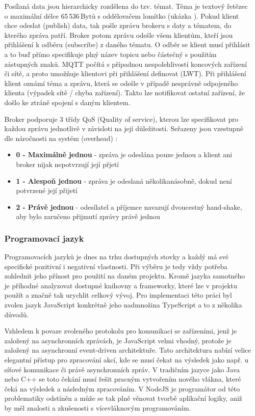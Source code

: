 Posílaná data jsou hierarchicky rozdělena do tzv. témat. Téma je textový řetězec o maximální délce 65\,536\,Bytů s oddělovačem lomítko (ukázka ). Pokud klient chce odeslat (publish) data, tak pošle zprávu brokeru s daty a tématem, do kterého zpráva patří. Broker potom zprávu odešle všem klientům, kteří jsou přihlášení k odběru (subscribe) z daného tématu. O odběr se klient musí přihlásit a to buď přímo specifikuje plný název topicu nebo částečný s použitím zástupných znaků. MQTT počítá s případnou nespolehlivostí koncových zařízení či sítě, a proto umožňuje klientovi při přihlášení definovat  (\hypertarget{LWT}{LWT}). Při přihlášení klient oznámí téma a zprávu, která se odešle v případě nesprávně odpojeného klienta (výpadek sítě / chyba zařízení). Takto lze notifikovat ostatní zařízení, že došlo ke ztráně spojení s daným klientem. \cite{mqtt}

Broker podporuje 3 třídy QoS (Quality of service), kterou lze specifikovat pro každou zprávu jednotlivě v závisloti na její důležitosti. Seřazeny jsou vzestupně dle náročnosti na systém (overhead) \cite{mqtt}:
\begin{itemize}
    \item \textbf{0 - Maximálně jednou} - zpráva je odeslána pouze jednou a klient ani broker nijak nepotvrzují její přjetí
    \item \textbf{1 - Alespoň jednou} - zpráva je odeslaná několikanásobně, dokud není potvrzené její přijetí
    \item \textbf{2 - Právě jednou} - odesílatel a příjemce navazují dvoucestný hand-shake, aby bylo zaručeno přijmutí zprávy právě jednou
\end{itemize}


\subsubsection{Programovací jazyk}
Programovacích jazyků je dnes na trhu dostupných stovky a každý má své specifické pozitivní i negativní vlastnosti. Při výběru je tedy vždy potřeba zohlednit jeho přínost pro použití na daném projektu. Kromě jazyka samotného je příhodné analyzovat dostupné knihovny a frameworky, které lze v projektu použít a značně tak urychlit celkový vývoj. Pro implementaci této práci byl zvolen jazyk JavaScript konkrétně jeho nadmnožina TypeScript a to z několika důvodů.

Vzhledem k povaze zvoleného protokolu pro komunikaci se zařízeními, jenž je založený na asynchronních zprávách, je JavaScript velmi vhodný, protože je založený na asynchronní event-driven \cite{nodejs} architektuře. Tato architektura nabízí velice elegantní přístup pro zpracování akcí, kde se musí čekat na výsledek jako např. u síťové komunikace či právě asynchronních zpráv. V tradičním jazyce jako Java nebo C++ se toto čekání musí řešit pracným vytvořením nového vlákna, které čeká na výsledek a následným zpracováním. V NodeJS je programátor od této problematiky odstíněn a může se tak plně věnovat tvorbě aplikační logiky, aniž by měl znalosti a zkušenosti s vícevláknovým programováním.


